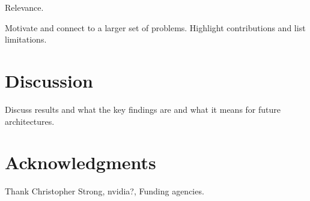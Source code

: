 \documentclass{sig-alternate}
\begin{document}
Relevance. 
 
Motivate and connect to a larger set of problems. Highlight contributions and list limitations.











\section{Discussion}
Discuss results and what the key findings are and what it means for future architectures.


\section{Acknowledgments}
Thank Christopher Strong, nvidia?, Funding agencies.


%

 

\end{document}
